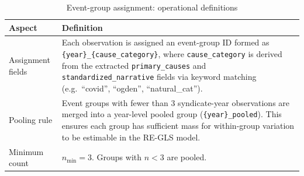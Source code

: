 \begin{table}[htbp]
\centering
\caption{Event-group assignment: operational definitions}
\label{tab:event_group_ops}
\begin{tabular}{lp{10cm}}
\toprule
\textbf{Aspect} & \textbf{Definition} \\
\midrule
Assignment fields & Each observation is assigned an event-group ID formed as \texttt{\{year\}\_\{cause\_category\}}, where \texttt{cause\_category} is derived from the extracted \texttt{primary\_causes} and \texttt{standardized\_narrative} fields via keyword matching (e.g.\ ``covid'', ``ogden'', ``natural\_cat''). \\
\midrule
Pooling rule & Event groups with fewer than 3 syndicate-year observations are merged into a year-level pooled group (\texttt{\{year\}\_pooled}). This ensures each group has sufficient mass for within-group variation to be estimable in the RE-GLS model. \\
\midrule
Minimum count & $n_{\min} = 3$. Groups with $n < 3$ are pooled. \\
\bottomrule
\end{tabular}
\end{table}
